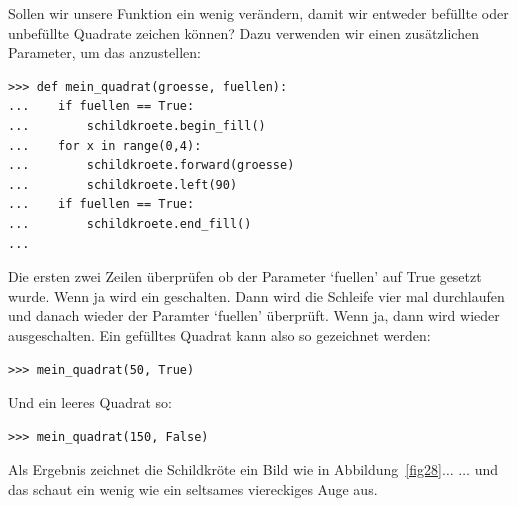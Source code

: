 Sollen wir unsere Funktion ein wenig verändern, damit wir entweder befüllte oder unbefüllte Quadrate zeichen können? Dazu verwenden wir einen zusätzlichen Parameter, um das anzustellen:

\begin{Verbatim}[frame=single]
>>> def mein_quadrat(groesse, fuellen):
...    if fuellen == True:
...        schildkroete.begin_fill()
...    for x in range(0,4):
...        schildkroete.forward(groesse)
...        schildkroete.left(90)
...    if fuellen == True:
...        schildkroete.end_fill()
...
\end{Verbatim}

Die ersten zwei Zeilen überprüfen ob der Parameter `fuellen' auf True gesetzt wurde. Wenn ja wird  ein geschalten. Dann wird die Schleife vier mal durchlaufen und danach wieder der Paramter `fuellen' überprüft. Wenn ja, dann wird  wieder ausgeschalten. Ein gefülltes Quadrat kann also so gezeichnet werden:

\begin{Verbatim}[frame=single]
>>> mein_quadrat(50, True)
\end{Verbatim}

\noindent
Und ein leeres Quadrat so:

\begin{Verbatim}[frame=single]
>>> mein_quadrat(150, False)
\end{Verbatim}

\noindent
Als Ergebnis zeichnet die Schildkröte ein Bild wie in Abbildung~\ref{fig28}$\ldots$ $\ldots$ und das schaut ein wenig wie ein seltsames viereckiges Auge aus.


